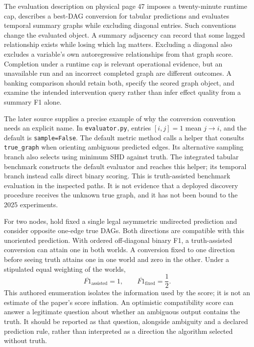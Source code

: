 The evaluation description on physical page 47 imposes a twenty-minute runtime
cap, describes a best-DAG conversion for tabular predictions and evaluates
temporal summary graphs while excluding diagonal entries. Such conventions
change the evaluated object. A summary adjacency can record that some lagged
relationship exists while losing which lag matters. Excluding a diagonal
also excludes a variable's own autoregressive relationships from that graph
score. Completion under a runtime cap is relevant operational evidence, but
an unavailable run and an incorrect completed graph are different outcomes.
A banking comparison should retain both, specify the scored graph object,
and examine the intended intervention query rather than infer effect quality
from a summary F1 alone.\citep{exec17_copilot_paper}

The later source supplies a precise example of why the conversion convention
needs an explicit name. In \texttt{evaluator.py}, entries $[i,j]=1$ mean
$j\to i$, and the default is \texttt{sample=False}. The default metric method
calls a helper that consults \texttt{true\_graph} when orienting ambiguous
predicted edges. Its alternative sampling branch also selects using minimum
SHD against truth. The integrated tabular benchmark constructs the default
evaluator and reaches this helper; its temporal branch instead calls direct
binary scoring. This is truth-assisted benchmark evaluation in the inspected
paths. It is not evidence that a deployed discovery procedure receives the
unknown true graph, and it has not been bound to the 2025 experiments.
\citep{exec17_copilot_code}

For two nodes, hold fixed a single legal asymmetric undirected prediction and
consider opposite one-edge true DAGs. Both directions are compatible with this
unoriented prediction. With ordered off-diagonal binary F1, a truth-assisted
conversion can attain one in both worlds. A conversion fixed to one direction
before seeing truth attains one in one world and zero in the other. Under a
stipulated equal weighting of the worlds,
\begin{equation}
 \overline{F1}_{\mathrm{assisted}}=1,\qquad
 \overline{F1}_{\mathrm{fixed}}=\frac12.
 \label{exec17:copilot-score}
\end{equation}
This authored enumeration isolates the information used by the score; it is
not an estimate of the paper's score inflation. An optimistic compatibility
score can answer a legitimate question about whether an ambiguous output
contains the truth. It should be reported as that question, alongside ambiguity
and a declared prediction rule, rather than interpreted as a direction the
algorithm selected without truth.\citep{exec17_copilot_exact}

